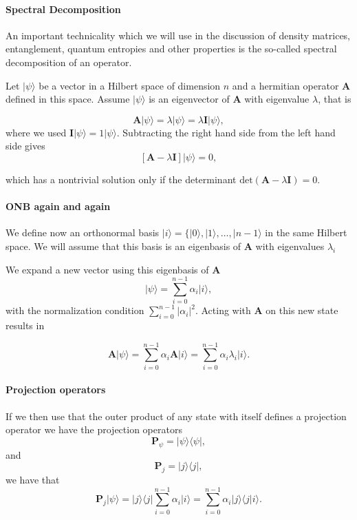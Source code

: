 \paragraph{Spectral Decomposition}

An important technicality which we will use in the discussion of
density matrices, entanglement, quantum entropies and other properties
is the so-called spectral decomposition of an operator.

Let $\vert \psi\rangle$ be a vector in a Hilbert space of dimension $n$ and a hermitian operator $\bm{A}$ defined in this
space. Assume $\vert \psi\rangle$ is an eigenvector of $\bm{A}$ with eigenvalue $\lambda$, that is

\[
\bm{A}\vert \psi\rangle = \lambda\vert \psi\rangle = \lambda \bm{I}\vert \psi \rangle,
\]
where we used $\bm{I}\vert \psi \rangle = 1 \vert \psi \rangle$.
Subtracting the right hand side from the left hand side gives
\[
\left[\bm{A}-\lambda \bm{I}\right]\vert \psi \rangle=0,
\]

which has a nontrivial solution only if the determinant
$\mathrm{det}(\bm{A}-\lambda\bm{I})=0$.


\paragraph{ONB again and again}

We define now an orthonormal basis $\vert i \rangle =\{\vert 0
\rangle, \vert 1\rangle, \dots, \vert n-1\rangle$ in the same Hilbert
space. We will assume that this basis is an eigenbasis of $\bm{A}$ with eigenvalues $\lambda_i$

We expand a new vector using this eigenbasis of $\bm{A}$
\[
\vert \psi \rangle = \sum_{i=0}^{n-1}\alpha_i\vert i\rangle,
\]
with the normalization condition $\sum_{i=0}^{n-1}\vert \alpha_i\vert^2$.
Acting with $\bm{A}$ on this new state results in

\[
\bm{A}\vert \psi \rangle = \sum_{i=0}^{n-1}\alpha_i\bm{A}\vert i\rangle=\sum_{i=0}^{n-1}\alpha_i\lambda_i\vert i\rangle.
\]


\paragraph{Projection operators}

If we then use that the outer product of any state with itself defines a projection operator we have the projection operators
\[
\bm{P}_{\psi} = \vert \psi\rangle\langle \psi\vert,
\]
and
\[
\bm{P}_{j} = \vert j\rangle\langle j\vert,
\]
we have that 
\[
\bm{P}_{j}\vert \psi\rangle=\vert j\rangle\langle j\vert\sum_{i=0}^{n-1}\alpha_i\vert i\rangle=\sum_{i=0}^{n-1}\alpha_i\vert j\rangle\langle j\vert i\rangle.
\]


